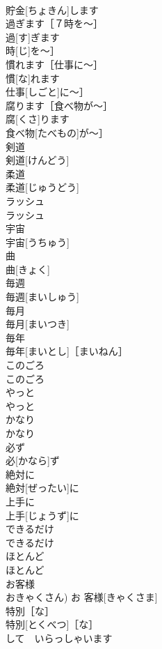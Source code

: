 \documentclass[8pt]{extreport}
\begin{document}
\begin{CJK}{UTF8}{min}
\\	貯金[ちょきん]します	
\\	過ぎます［７時を〜］	
\\	過[す]ぎます
\\	時[じ]を〜］	
\\	慣れます［仕事に〜］	
\\	慣[な]れます
\\	仕事[しごと]に〜］	
\\	腐ります［食べ物が〜］	
\\	腐[くさ]ります
\\	食べ物[たべもの]が〜］	
\\	剣道	
\\	剣道[けんどう]	
\\	柔道	
\\	柔道[じゅうどう]	
\\	ラッシュ	
\\	ラッシュ	
\\	宇宙	
\\	宇宙[うちゅう]	
\\	曲	
\\	曲[きょく]	
\\	毎週	
\\	毎週[まいしゅう]	
\\	毎月	
\\	毎月[まいつき]	
\\	毎年	
\\	毎年[まいとし]［まいねん］	
\\	このごろ	
\\	このごろ	
\\	やっと	
\\	やっと	
\\	かなり	
\\	かなり	
\\	必ず	
\\	必[かなら]ず	
\\	絶対に	
\\	絶対[ぜったい]に	
\\	上手に	
\\	上手[じょうず]に	
\\	できるだけ	
\\	できるだけ	
\\	ほとんど	
\\	ほとんど	
\\	お客様	
\\	おきゃくさん)	お 客様[きゃくさま]	
\\	特別［な］	
\\	特別[とくべつ]［な］	
\\	して　いらっしゃいます	

\end{CJK}
\end{document}
